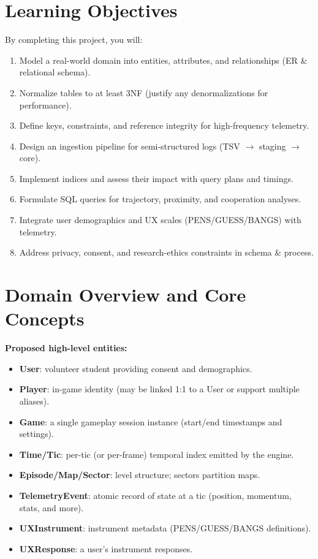 \documentclass[11pt]{article}
\begin{document}
\section{Learning Objectives}
By completing this project, you will:
\begin{enumerate}[leftmargin=*]
  \item Model a real-world domain into entities, attributes, and relationships (ER \& relational schema).
  \item Normalize tables to at least 3NF (justify any denormalizations for performance).
  \item Define keys, constraints, and reference integrity for high-frequency telemetry.
  \item Design an ingestion pipeline for semi-structured logs (TSV $\rightarrow$ staging $\rightarrow$ core).
  \item Implement indices and assess their impact with query plans and timings.
  \item Formulate SQL queries for trajectory, proximity, and cooperation analyses.
  \item Integrate user demographics and UX scales (PENS/GUESS/BANGS) with telemetry.
  \item Address privacy, consent, and research-ethics constraints in schema \& process.
\end{enumerate}

\section{Domain Overview and Core Concepts}
\textbf{Proposed high-level entities:}
\begin{itemize}[leftmargin=*]
  \item \textbf{User}: volunteer student providing consent and demographics.
  \item \textbf{Player}: in-game identity (may be linked 1:1 to a User or support multiple aliases).
  \item \textbf{Game}: a single gameplay session instance (start/end timestamps and settings).
  \item \textbf{Time/Tic}: per-tic (or per-frame) temporal index emitted by the engine.
  \item \textbf{Episode/Map/Sector}: level structure; sectors partition maps.
  \item \textbf{TelemetryEvent}: atomic record of state at a tic (position, momentum, stats, and more).
  \item \textbf{UXInstrument}: instrument metadata (PENS/GUESS/BANGS definitions).
  \item \textbf{UXResponse}: a user's instrument responses.
\end{itemize}
\end{document}
